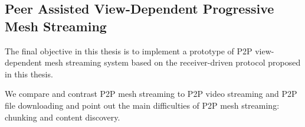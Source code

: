     \begin{comment}
    \subsection{Analyze User Behaviors in Interacting with Meshes}
    Our third objective is to study user behavior from the system design point of view, 
    such as predictability and access pattern, and to develop a model, with which we
    could generate arbitrary number of synthetic traces to be used in measuring the performance
    of progressive mesh streaming system.
    We have conducted a user experiment with 37 users interacting with 9 meshes.
    We log the user's actions while they interact and view the meshes in a mock online shop.
    Then we analyze these traces to derive the patterns of user behaviors. Then we proposed
    a simple model to generate synthetic traces.

    The analysis of user traces reveals that user actions are predictable to certain extent. 
    Hence, pre-fetching based on our analysis becomes possible. Moreover, we found that 
    locality exists in both data and viewpoint access. As a result, 
    by storing the most popular mesh data in caching proxies, 
    the server overhead could be significantly reduced. 
    Moreover, caching rendered images can be useful in remote rendering,
    and caching faces and textures in the memory of graphic card is useful in improving rendering speed.
    Finally, We develop a method to generate random user actions
    and use them in simulations, which are useful in testing protocols and measuring system performance.
    We compared the synthetic user traces and the real traces in various aspects and found
    that they have similar properties.
\end{comment}
    
    \subsection{Peer Assisted View-Dependent Progressive Mesh Streaming}
    The final objective in this thesis is to implement a prototype of 
    P2P view-dependent mesh streaming system
    based on the receiver-driven protocol proposed in this thesis.
    
    We compare and contrast P2P mesh streaming to P2P
    video streaming and P2P file downloading and point out
    the main difficulties of P2P mesh streaming:  
    chunking and content discovery.

